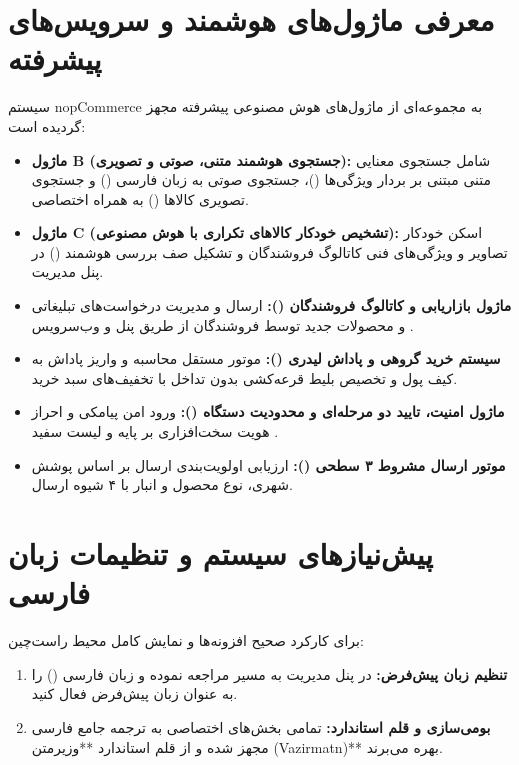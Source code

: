 \documentclass[12pt,a4paper]{article}
\begin{document}
\section{معرفی ماژول‌های هوشمند و سرویس‌های پیشرفته}
سیستم nopCommerce به مجموعه‌ای از ماژول‌های هوش مصنوعی پیشرفته مجهز گردیده است:
\begin{itemize}[label=\small$\bullet$]
    \item \textbf{ماژول B (جستجوی هوشمند متنی، صوتی و تصویری):}
    شامل جستجوی معنایی متنی مبتنی بر بردار ویژگی‌ها ()، جستجوی صوتی به زبان فارسی () و جستجوی تصویری کالاها () به همراه  اختصاصی.
    \item \textbf{ماژول C (تشخیص خودکار کالاهای تکراری با هوش مصنوعی):}
    اسکن خودکار تصاویر و ویژگی‌های فنی کاتالوگ فروشندگان و تشکیل صف بررسی هوشمند () در پنل مدیریت.
    \item \textbf{ماژول بازاریابی و کاتالوگ فروشندگان ():}
    ارسال و مدیریت درخواست‌های تبلیغاتی و محصولات جدید توسط فروشندگان از طریق پنل و وب‌سرویس .
    \item \textbf{سیستم خرید گروهی و پاداش لیدری ():}
    موتور مستقل محاسبه و واریز پاداش به کیف پول و تخصیص بلیط قرعه‌کشی بدون تداخل با تخفیف‌های سبد خرید.
    \item \textbf{ماژول امنیت، تایید دو مرحله‌ای و محدودیت دستگاه ():}
    ورود امن پیامکی و احراز هویت سخت‌افزاری بر پایه  و لیست سفید .
    \item \textbf{موتور ارسال مشروط ۳ سطحی ():}
    ارزیابی اولویت‌بندی ارسال بر اساس پوشش شهری، نوع محصول و انبار با ۴ شیوه ارسال.
\end{itemize}

\section{پیش‌نیازهای سیستم و تنظیمات زبان فارسی}
برای کارکرد صحیح افزونه‌ها و نمایش کامل محیط راست‌چین:
\begin{enumerate}
    \item \textbf{تنظیم زبان پیش‌فرض:} در پنل مدیریت به مسیر  مراجعه نموده و زبان فارسی () را به عنوان زبان پیش‌فرض فعال کنید.
    \item \textbf{بومی‌سازی و قلم استاندارد:} تمامی بخش‌های اختصاصی به ترجمه جامع فارسی مجهز شده و از قلم استاندارد **وزیرمتن (Vazirmatn)** بهره می‌برند.
\end{enumerate}
\end{document}
